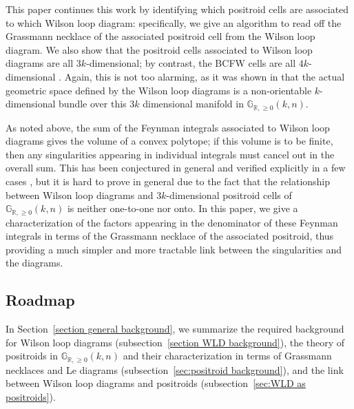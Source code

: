 \documentclass[11pt]{article}
\newcommand{\R}{\mathbb{R}}
\newcommand{\Gr}{\mathbb{G}_{\R, \geq 0}}
\theoremstyle{remark}
\theoremstyle{definition}
\begin{document}
This paper continues this work by identifying which positroid cells are associated to which Wilson loop diagram: specifically, we give an algorithm to read off the Grassmann necklace of the associated positroid cell from the Wilson loop diagram. We also show that the positroid cells associated to Wilson loop diagrams are all $3k$-dimensional; by contrast, the BCFW cells are all $4k$-dimensional \cite{Arkani-Hamed:2013jha}. Again, this is not too alarming, as it was shown in \cite{non-orientable} that the actual geometric space defined by the Wilson loop diagrams is a non-orientable $k$-dimensional bundle over this $3k$ dimensional manifold in $\Gr(k,n)$.

As noted above, the sum of the Feynman integrals associated to Wilson loop diagrams gives the volume of a convex polytope; if this volume is to be finite, then any singularities appearing in individual integrals must cancel out in the overall sum. This has been conjectured in general \cite{Hodges2013} and verified explicitly in a few cases \cite{casestudy, HeslopStewart}, but it is hard to prove in general due to the fact that the relationship between Wilson loop diagrams and $3k$-dimensional positroid cells of $\Gr(k,n)$ is neither one-to-one nor onto. In this paper, we give a characterization of the factors appearing in the denominator of these Feynman integrals in terms of the Grassmann necklace of the associated positroid, thus providing a much simpler and more tractable link between the singularities and the diagrams. 


\subsection{Roadmap}

In Section~\ref{section general background}, we summarize the required background for Wilson loop diagrams (subsection~\ref{section WLD background}), the theory of positroids in $\Gr(k,n)$ and their characterization in terms of Grassmann necklaces and Le diagrams (subsection~\ref{sec:positroid background}), and the link between Wilson loop diagrams and positroids (subsection~\ref{sec:WLD as positroids}).
\end{document}
